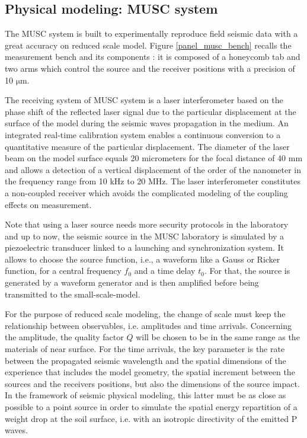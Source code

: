 \documentclass[manuscript,revised]{geophysics}
\begin{document}
\subsection{Physical modeling: MUSC system}

\noindent The MUSC system \citep{Bretaudeau_SSA_2008b,Bretaudeau_SSM_2011,Bretaudeau_FWI_2013} is built to experimentally reproduce field seismic data with a great accuracy on reduced scale model. Figure \ref{panel_musc_bench} recalls the measurement bench and its components : it is composed of a honeycomb tab and two arms which control the source and the receiver positions with a precision of 10 $\mathrm{\mu m}$.

\noindent The receiving system of MUSC system is a laser interferometer based on the phase shift of the reflected laser signal due to the particular displacement at the surface of the model during the seismic waves propagation in the medium. An integrated real-time calibration system enables a continuous conversion to a quantitative measure of the particular displacement. The diameter of the laser beam on the model surface equals 20 micrometers for the focal distance of 40 mm and allows a detection of a vertical displacement of the order of the nanometer in the frequency range from 10 kHz to 20 MHz. The laser interferometer constitutes a non-coupled receiver which avoids the complicated modeling of the coupling effects on measurement.

\noindent Note that using a laser source needs more security protocols in the laboratory and up to now, the seismic source in the MUSC laboratory is simulated by a piezoelectric transducer linked to a launching and synchronization system. It allows to choose the source function, i.e., a waveform like a Gauss or Ricker function, for a central frequency $f_{0}$ and a time delay $t_{0}$. For that, the source is generated by a waveform generator and is then amplified before being transmitted to the small-scale-model.

\noindent For the purpose of reduced scale modeling, the change of scale must keep the relationship between observables, i.e. amplitudes and time arrivals. Concerning the amplitude, the quality factor $Q$ will be chosen to be in the same range as the materials of near surface. For the time arrivals, the key parameter is the rate between the propagated seismic wavelength and the spatial dimensions of the experience that includes the model geometry, the spatial increment between the sources and the receivers positions, but also the dimensions of the source impact. In the framework of seismic physical modeling, this latter must be as close as possible to a point source in order to simulate the spatial energy repartition of a weight drop at the soil surface, i.e. with an isotropic directivity of the emitted P waves.
\end{document}
